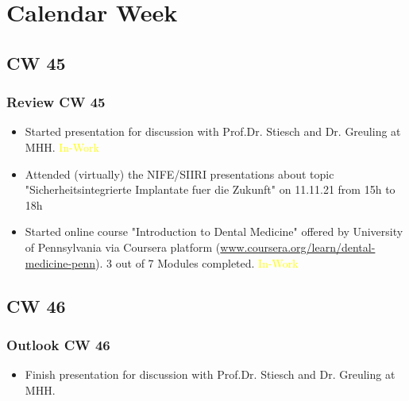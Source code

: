 \section{Calendar Week}
\subsection{CW 45}
\begin{frame}
  \frametitle{Review CW 45}
	\begin{itemize}
		\item Started presentation for discussion with Prof.Dr. Stiesch and Dr. Greuling at MHH. \textcolor{yellow}{In-Work}
		\item Attended (virtually) the NIFE/SIIRI presentations about topic "Sicherheitsintegrierte Implantate fuer die Zukunft" on 11.11.21 from 15h to 18h
		\item Started online course "Introduction to Dental Medicine" offered by University of Pennsylvania via Coursera platform (\url{www.coursera.org/learn/dental-medicine-penn}). 3 out of 7 Modules completed. \textcolor{yellow}{In-Work}
	\end{itemize}
\end{frame}


\subsection{CW 46}
\begin{frame}
  \frametitle{Outlook CW 46}
	\begin{itemize}
		\item Finish presentation for discussion with Prof.Dr. Stiesch and Dr. Greuling at MHH.
	\end{itemize}
\end{frame}

